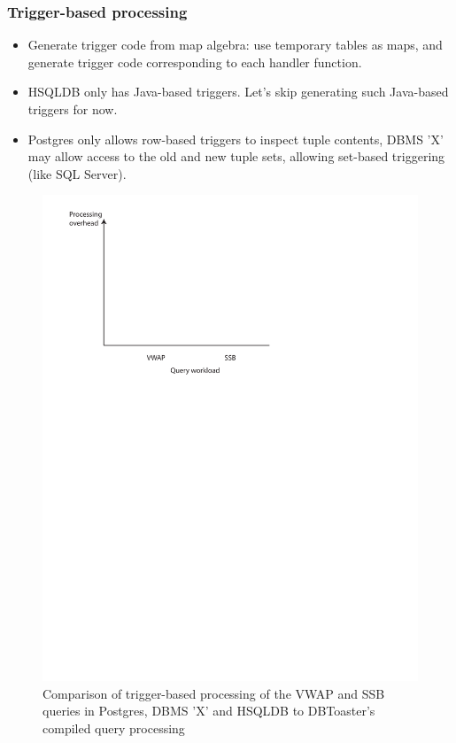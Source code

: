 {\subsubsection{Trigger-based processing}
\begin{itemize}
\item Generate trigger code from map algebra: use temporary tables as maps, and
  generate trigger code corresponding to each handler function.
\item HSQLDB only has Java-based triggers. Let's skip generating such Java-based
  triggers for now.
\item Postgres only allows row-based triggers to inspect tuple contents, DBMS
  'X' may allow access to the old and new tuple sets, allowing set-based
  triggering (like SQL Server).
\end{itemize}

\begin{figure}
\includegraphics[scale=0.6]{figures/axes-triggers.pdf}
\caption{Comparison of trigger-based processing of the VWAP and SSB queries in
Postgres, DBMS 'X' and HSQLDB to DBToaster's compiled query processing}
\label{fig:overhead-trigger}
\end{figure}

}

